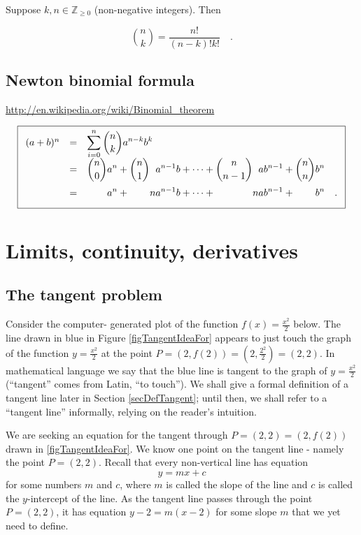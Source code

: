 \documentclass[12pt]{book}
\begin{document}
Suppose $k,n\in \mathbb Z_{\geq 0}$ (non-negative integers). Then

\[\binom{n}{k} = \frac{n!}{(n-k)! k!}\quad .
\]

\section{Newton binomial formula}\label{secNewtonBinomialReview}
\url{http://en.wikipedia.org/wiki/Binomial_theorem}



\begin{equation}\boxed{\label{eqNewtonBinomialFormula}
\begin{array}{rcl}
(a+b)^{n} &=&\displaystyle \sum\limits_{i=0}^n \binom {n}{k} a^{n-k}b^{k} \\
&=&\displaystyle \binom{n}{0} a^n + \binom{n}{1}\phantom{n}a^{n-1}b +\dots+ \binom{n}{n-1} \phantom{n} ab^{n-1} + \binom{n}{n} b^n\\
&=&\displaystyle \phantom{\binom{n}{0}}a^n + \phantom{\binom{n}1} n a^{n-1}b+\dots + \phantom{\binom{n}{n-1}} na b^{n-1}+\phantom{\binom{n}{n}} b^n \quad .
\end{array}
}
\end{equation}

\chapter{Limits, continuity, derivatives}
\section{The tangent problem}
Consider the computer- generated plot of the function $f(x)=\frac{x^2}2$ below. The line drawn in blue in Figure \ref{figTangentIdeaFor} appears to just touch the graph of the function $y=\frac{x^2}2$ at the point $P=(2,f(2))=(2, \frac{2^2}{2}) =(2,2)$. In mathematical language we say that the blue line is tangent to the graph of $ y=\frac{x^2}2$ (``tangent'' comes from Latin, ``to touch''). We shall give a formal definition of a tangent line later in Section \ref{secDefTangent}; until then, we shall refer to a ``tangent line'' informally, relying on the reader's intuition.

We are seeking an equation for the tangent through $P=(2,2)=(2, f(2))$ drawn in \ref{figTangentIdeaFor}. We know one point on the tangent line - namely the point $P=(2,2)$. Recall that every non-vertical line has equation
\[
y=mx+c
\]
for some numbers $m$ and $c$, where $m$ is called the slope
of the line and $c$ is called the $y$-intercept of the line. As the tangent line passes through the point $P=(2,2)$, it has equation $y-2=m(x-2)$ for some slope $m$ that we yet need to define.
\end{document}
